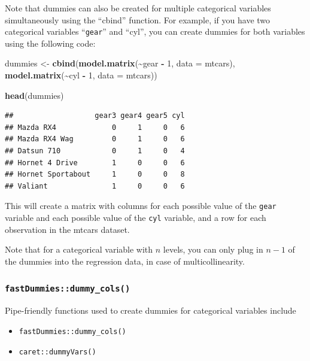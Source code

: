 \documentclass[
]{ctexart}
\newenvironment{Shaded}{\begin{snugshade}}{\end{snugshade}}
\newcommand{\AttributeTok}[1]{\textcolor[rgb]{0.13,0.29,0.53}{#1}}
\newcommand{\DecValTok}[1]{\textcolor[rgb]{0.00,0.00,0.81}{#1}}
\newcommand{\FunctionTok}[1]{\textcolor[rgb]{0.13,0.29,0.53}{\textbf{#1}}}
\newcommand{\NormalTok}[1]{#1}
\newcommand{\OtherTok}[1]{\textcolor[rgb]{0.56,0.35,0.01}{#1}}
\newcommand{\SpecialCharTok}[1]{\textcolor[rgb]{0.81,0.36,0.00}{\textbf{#1}}}
\providecommand{\tightlist}{%
  \setlength{\itemsep}{0pt}\setlength{\parskip}{0pt}}
\begin{document}
Note that dummies can also be created for multiple categorical variables
simultaneously using the ``cbind'' function. For example, if you have
two categorical variables ``\texttt{gear}'' and ``cyl'', you can create
dummies for both variables using the following code:

\begin{Shaded}
\begin{Highlighting}[]
\NormalTok{dummies }\OtherTok{\textless{}{-}} \FunctionTok{cbind}\NormalTok{(}\FunctionTok{model.matrix}\NormalTok{(}\SpecialCharTok{\textasciitilde{}}\NormalTok{gear }\SpecialCharTok{{-}} \DecValTok{1}\NormalTok{, }\AttributeTok{data =}\NormalTok{ mtcars), }
                 \FunctionTok{model.matrix}\NormalTok{(}\SpecialCharTok{\textasciitilde{}}\NormalTok{cyl }\SpecialCharTok{{-}} \DecValTok{1}\NormalTok{, }\AttributeTok{data =}\NormalTok{ mtcars))}

\FunctionTok{head}\NormalTok{(dummies)}
\end{Highlighting}
\end{Shaded}

\begin{verbatim}
##                   gear3 gear4 gear5 cyl
## Mazda RX4             0     1     0   6
## Mazda RX4 Wag         0     1     0   6
## Datsun 710            0     1     0   4
## Hornet 4 Drive        1     0     0   6
## Hornet Sportabout     1     0     0   8
## Valiant               1     0     0   6
\end{verbatim}

This will create a matrix with columns for each possible value of the
\texttt{gear} variable and each possible value of the \texttt{cyl}
variable, and a row for each observation in the mtcars dataset.

Note that for a categorical variable with \(n\) levels, you can only
plug in \(n-1\) of the dummies into the regression data, in case of
multicollinearity.

\hypertarget{fastdummiesdummy_cols}{%
\subsubsection{\texorpdfstring{\texttt{fastDummies::dummy\_cols()}}{fastDummies::dummy\_cols()}}\label{fastdummiesdummy_cols}}

Pipe-friendly functions used to create dummies for categorical variables
include

\begin{itemize}
\tightlist
\item
  \texttt{fastDummies::dummy\_cols()}
\item
  \texttt{caret::dummyVars()}
\end{itemize}
\end{document}
